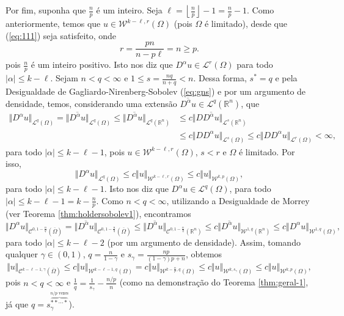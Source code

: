 \documentclass[a4paper, 11pt]{book}
\theoremstyle{definition}
\newcommand{\bR}{\mathbb{R}}
\newcommand{\cC}{\mathcal{C}}
\newcommand{\cL}{\mathcal{L}}
\newcommand{\cW}{\mathcal{W}}
\begin{document}
\begin{prf}
    Por fim, suponha que $\frac{n}{p}$ é um inteiro. Seja $\ell = \left\lfloor \frac{n}{p} \right\rfloor - 1 = \frac{n}{p} - 1$.
    Como anteriormente, temos que $u \in \cW^{k-\ell,r}(\Omega)$ (pois $\Omega$ é limitado), desde que (\ref{eq:111}) seja satisfeito, onde
    \[
        r = \frac{pn}{n - p\ell} = n \geqslant p.
    \]
    pois $\frac{n}{p}$ é um inteiro positivo.
    Isto nos diz que $D^\alpha u \in \cL^r(\Omega)$ para todo $|\alpha| \leqslant k - \ell$.
    Sejam $n < q < \infty$ e $1 \leqslant s = \frac{nq}{n + q} < n$. Dessa forma, $s^* = q$ e pela Desigualdade de Gagliardo-Nirenberg-Sobolev (\ref{eq:gns})  e por um argumento de densidade, temos, considerando uma extensão $\overline{D^\alpha u} \in \cL^q(\bR^n)$, que
    \[
        \begin{aligned}
            \Vert D^\alpha u \Vert_{\cL^q(\Omega)} = \Vert \overline{D^\alpha u}  \Vert_{\cL^q(\Omega)} \leqslant \Vert \overline{D^\alpha u} \Vert_{\cL^q(\bR^n)} &\leqslant c \Vert D \overline{D^\alpha u} \Vert_{\cL^s(\bR^n)}\\ &\leqslant c \Vert D D^\alpha u \Vert_{\cL^s(\Omega)} \leqslant c\Vert D D^\alpha u \Vert_{\cL^r(\Omega)} < \infty,
        \end{aligned}
    \]
    para todo $|\alpha| \leqslant k - \ell - 1$, pois $u \in \cW^{k-\ell,r}(\Omega)$, $s < r$ e $\Omega$ é limitado. Por isso,
    \[
        \Vert D^\alpha u \Vert_{\cL^q(\Omega)} \leqslant c \Vert u \Vert_{\cW^{k-\ell,r}(\Omega)} \leqslant c \Vert u \Vert_{\cW^{k,p}(\Omega)},
    \]
    para todo $|\alpha| \leqslant k - \ell - 1$. Isto nos diz que $D^\alpha u \in \cL^q(\Omega)$, para todo $|\alpha| \leqslant k - \ell - 1 = k - \frac{n}{p}$.
    Como $n < q < \infty$, utilizando a Desigualdade de Morrey (ver Teorema \ref{thm:holdersobolev1}), encontramos
    \[
        \Vert D^\alpha u \Vert_{\cC^{0,1-\frac{n}{q}}(\overline\Omega)} = \Vert \overline{D^\alpha u} \Vert_{\cC^{0,1-\frac{n}{q}}(\overline\Omega)} \leqslant \Vert \overline{D^\alpha u} \Vert_{\cC^{0,1 - \frac{n}{q}}(\bR^n)} \leqslant c \Vert \overline{D^\alpha u} \Vert_{\cW^{1,q}(\bR^n)} \leqslant c \Vert D^\alpha u \Vert_{\cW^{1,q}(\Omega)},
    \]
    para todo $|\alpha| \leqslant k - \ell - 2$ (por um argumento de densidade).
    Assim, tomando qualquer $\gamma \in (0,1)$, $q = \frac{n}{1 - \gamma}$ e $s_\gamma = \frac{np}{(1- \gamma)p + n}$, obtemos
    \[
        \Vert u \Vert_{\cC^{k-\ell-1,\gamma}(\overline\Omega)} \leqslant c\Vert u \Vert_{\cW^{k-\ell-1,q}(\Omega)} = c \Vert u \Vert_{\cW^{k-\frac{n}{p},q}(\Omega)} \leqslant c \Vert u \Vert_{\cW^{k,s_\gamma}(\Omega)} \leqslant c \Vert u \Vert_{\cW^{k,p}(\Omega)},
    \]
    pois $n < q < \infty$ e $\frac{1}{q} = \frac{1}{s_\gamma} - \frac{n/p}{n}$ (como na demonstração do Teorema \ref{thm:geral-1}, já que $q = s_\gamma^{\overbrace{**\cdots*}^{n/p \text{ vezes}}}$).
\end{prf}
\end{document}

